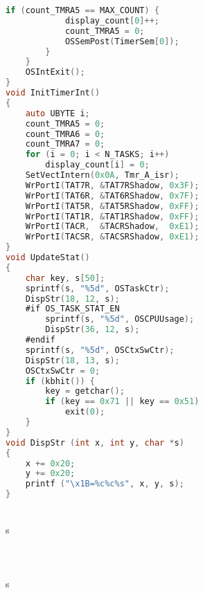\begin{lstlisting}[language=C]
        if (count_TMRA5 == MAX_COUNT) {
            display_count[0]++;
            count_TMRA5 = 0;
            OSSemPost(TimerSem[0]);
        }
    }
    OSIntExit();
}
void InitTimerInt()
{
    auto UBYTE i;
    count_TMRA5 = 0;
    count_TMRA6 = 0;
    count_TMRA7 = 0;
    for (i = 0; i < N_TASKS; i++)
        display_count[i] = 0;
    SetVectIntern(0x0A, Tmr_A_isr);
    WrPortI(TAT7R, &TAT7RShadow, 0x3F);
    WrPortI(TAT6R, &TAT6RShadow, 0x7F);
    WrPortI(TAT5R, &TAT5RShadow, 0xFF);
    WrPortI(TAT1R, &TAT1RShadow, 0xFF);
    WrPortI(TACR,  &TACRShadow,  0xE1);
    WrPortI(TACSR, &TACSRShadow, 0xE1);
}
void UpdateStat()
{
    char key, s[50];
    sprintf(s, "%5d", OSTaskCtr);
    DispStr(18, 12, s);
    #if OS_TASK_STAT_EN
        sprintf(s, "%5d", OSCPUUsage);
        DispStr(36, 12, s);
    #endif
    sprintf(s, "%5d", OSCtxSwCtr);
    DispStr(18, 13, s);
    OSCtxSwCtr = 0;
    if (kbhit()) {
        key = getchar();
        if (key == 0x71 || key == 0x51)
            exit(0);
    }
}
void DispStr (int x, int y, char *s)
{
    x += 0x20;
    y += 0x20;
    printf ("\x1B=%c%c%s", x, y, s);
}
\end{lstlisting}
\\ s
\\ 
\\ 
\\ 
\\ s